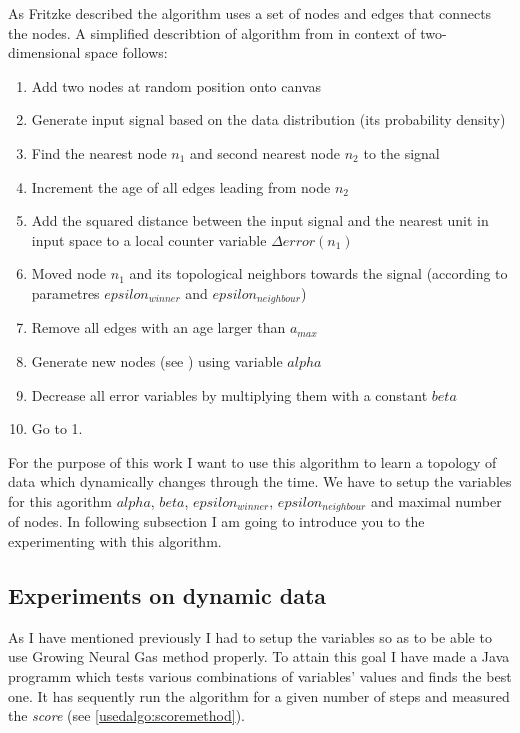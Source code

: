 As Fritzke described the algorithm uses a set of nodes and edges that connects the nodes. A simplified describtion of algorithm from \cite{Fritzke:gng} in context of two-dimensional space follows:

\begin{enumerate}
\item Add two nodes at random position onto canvas
\item Generate input signal based on the data distribution (its probability density)
\item Find the nearest node $n_1$ and second nearest node $n_2$ to the signal
\item Increment the age of all edges leading from node $n_2$
\item Add the squared distance between the input signal and the nearest unit in
input space to a local counter variable $\Delta error(n_{1})$
\item Moved node $n_1$ and its topological neighbors towards the signal (according to parametres $epsilon_{winner}$ and $epsilon_{neighbour}$)
\item Remove all edges with an age larger than $a_{max}$
\item Generate new nodes (see \cite{Fritzke:gng}) using variable $alpha$
\item Decrease all error variables by multiplying them with a constant $beta$
\item Go to 1.
\end{enumerate}

For the purpose of this work I want to use this algorithm to learn a topology of data which dynamically changes through the time. We have to setup the variables for this agorithm $alpha$, $beta$, $epsilon_{winner}$, $epsilon_{neighbour}$ and maximal number of nodes. In following subsection I am going to introduce you to the experimenting with this algorithm.

\subsection{Experiments on dynamic data}

As I have mentioned previously I had to setup the variables so as to be able to use Growing Neural Gas method properly. To attain this goal I have made a Java programm which tests various combinations of variables' values and finds the best one. It has sequently run the algorithm for a given number of steps and measured the \emph{score} (see \ref{usedalgo:scoremethod}).

